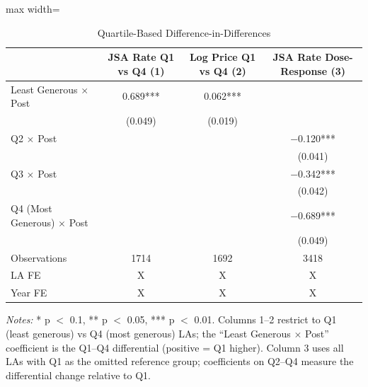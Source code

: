 \begin{table}
\centering
\caption{Quartile-Based Difference-in-Differences}
\centering
\begin{adjustbox}{max width=\textwidth}
\begin{tabular}[t]{lccc}
\toprule
  & JSA Rate
Q1 vs Q4
(1) & Log Price
Q1 vs Q4
(2) & JSA Rate
Dose-Response
(3)\\
\midrule
Least Generous $\times$ Post & \num{0.689}*** & \num{0.062}*** & \\
 & (\num{0.049}) & (\num{0.019}) & \\
Q2 $\times$ Post &  &  & \num{-0.120}***\\
 &  &  & (\num{0.041})\\
Q3 $\times$ Post &  &  & \num{-0.342}***\\
 &  &  & (\num{0.042})\\
Q4 (Most Generous) $\times$ Post &  &  & \num{-0.689}***\\
 &  &  & (\num{0.049})\\
\midrule
Observations & \num{1714} & \num{1692} & \num{3418}\\
LA FE & X & X & X\\
Year FE & X & X & X\\
\bottomrule

\end{tabular}
\end{adjustbox}
\begin{flushleft}
\footnotesize
\textit{Notes:} * p $<$ 0.1, ** p $<$ 0.05, *** p $<$ 0.01. Columns 1--2 restrict to Q1 (least generous) vs Q4 (most generous) LAs; the ``Least Generous $\times$ Post'' coefficient is the Q1--Q4 differential (positive = Q1 higher). Column 3 uses all LAs with Q1 as the omitted reference group; coefficients on Q2--Q4 measure the differential change relative to Q1.
\end{flushleft}
\end{table}
